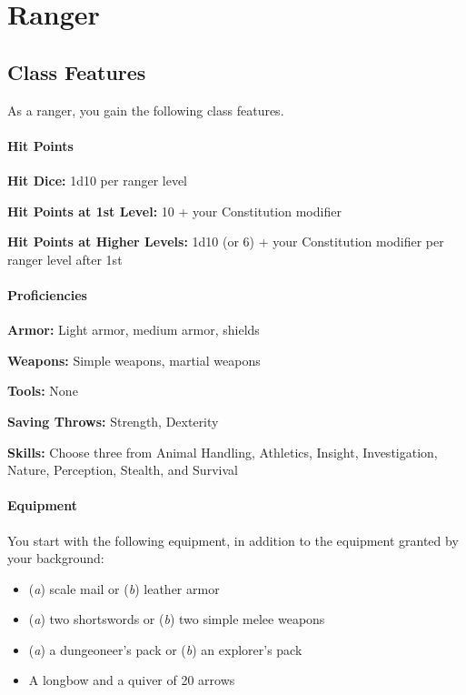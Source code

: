 \documentclass[
]{article}
\date{}
\providecommand{\tightlist}{%
  \setlength{\itemsep}{0pt}\setlength{\parskip}{0pt}}
\begin{document}
\hypertarget{ranger}{%
\section{Ranger}\label{ranger}}

\hypertarget{class-features}{%
\subsection{Class Features}\label{class-features}}

As a ranger, you gain the following class features.

\hypertarget{hit-points}{%
\paragraph{Hit Points}\label{hit-points}}

\textbf{Hit Dice:} 1d10 per ranger level

\textbf{Hit Points at 1st Level:} 10 + your Constitution modifier

\textbf{Hit Points at Higher Levels:} 1d10 (or 6) + your Constitution
modifier per ranger level after 1st

\hypertarget{proficiencies}{%
\paragraph{Proficiencies}\label{proficiencies}}

\textbf{Armor:} Light armor, medium armor, shields

\textbf{Weapons:} Simple weapons, martial weapons

\textbf{Tools:} None

\textbf{Saving Throws:} Strength, Dexterity

\textbf{Skills:} Choose three from Animal Handling, Athletics, Insight,
Investigation, Nature, Perception, Stealth, and Survival

\hypertarget{equipment}{%
\paragraph{Equipment}\label{equipment}}

You start with the following equipment, in addition to the equipment
granted by your background:

\begin{itemize}
\tightlist
\item
  (\emph{a}) scale mail or (\emph{b}) leather armor
\item
  (\emph{a}) two shortswords or (\emph{b}) two simple melee weapons
\item
  (\emph{a}) a dungeoneer's pack or (\emph{b}) an explorer's pack
\item
  A longbow and a quiver of 20 arrows
\end{itemize}
\end{document}
